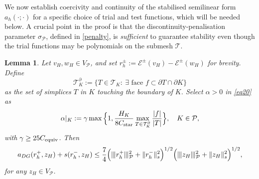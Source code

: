 \documentclass[11pt,final]{amsart}
\theoremstyle{plain}
\newtheorem{lemma}[theorem]{Lemma}
\theoremstyle{definition}
\newcommand\calP{{\mathcal{P}}}
\newcommand\calT{{\mathcal{T}}}
\newcommand{\mesh}{\calP}
\newcommand{\ndgp}[1]{| \kern -.25mm \|{#1}| \kern -.25mm \|_{\rm \mesh}}
\newcommand{\norm}[2]{\|{#1}\|_{{#2}}}
\renewcommand{\k}{K}
\begin{document}
We now establish coercivity and continuity of the stabilised
semilinear form $a_h(\cdot;\cdot)$ for a specific choice of trial and
test functions, which will be needed below. A crucial point in the
proof is that the discontinuity-penalisation parameter $\sigma_\calP$,
defined in \eqref{penalty}, is \emph{sufficient} to guarantee
stability even though the trial functions may be polynomials on the
submesh $\calT$.

\begin{lemma}\label{Lem:cont_twoscale}
Let $v_H,w_H\in V_\calP$, and set
$r_h^\pm:=\mathcal{E}^\pm(v_H)-\mathcal{E}^\pm(w_H)$ for brevity.
Define
\[
\calT_\k^\partial:=\{T\in \calT_\k:\ \exists \text{ face } f\subset \partial T\cap\partial K\}
\]
as the set of simplices $T$ in $\k$ touching the boundary of $\k$.  
Select $\alpha>0$ in \eqref{eq20} as
\begin{equation}\label{alpha_choice}
  \alpha|_\k:= \gamma \max\Big\{1,\frac{ H_{\k}}{8C_{\rm star}}\max_{T\in\calT_\k^\partial}\frac{|f|}{|T|}\Big\},\quad K\in\mesh,
\end{equation}
with $\gamma\ge 25C_{\rm equiv}$. Then
\begin{align}\label{cont_nonlinear}
a_{DG}(r_h^+, z_H) +s(r_h^-,z_H) 
\le \frac{7}{4}\Big(\ndgp{r_h^+}^2+\norm{r_h^-}{s}^2\Big)^{1/2} 
\Big(\ndgp{z_H}^2+\norm{z_H}{s}^2\Big)^{1/2}, 
\end{align}
for any $z_H\in V_\mesh$.
\end{lemma}
\end{document}

